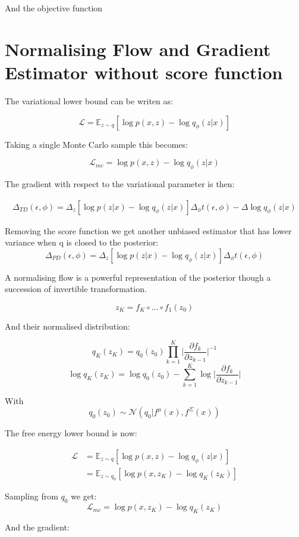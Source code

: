 \documentclass[a4paper]{article}
\begin{document}
And the objective function


\section{Normalising Flow and Gradient Estimator without score function}

The variational lower bound can be writen as:

$$ \mathcal{L} = \mathbb{E}_{z \sim q}[\log p(x, z) - \log q_\phi(z|x)] $$

Taking a single Monte Carlo sample this becomes:

$$ \mathcal{L}_{mc} = \log p(x, z) - \log q_\phi(z|x) $$

The gradient with respect to the variational parameter is then:

\begin{align}
\Delta_{TD}(\epsilon, \phi) = \Delta_z[\log p(z|x) -  \log q_\phi(z|x)] \Delta_\phi t(\epsilon, \phi) - \Delta \log q_\phi(z|x)
\end{align}

Removing the score function we get another unbiased estimator that has lower variance when q is closed to the posterior:
$$ \Delta_{PD}(\epsilon, \phi) =  \Delta_z[\log p(z|x) -  \log q_\phi(z|x)] \Delta_\phi t(\epsilon, \phi)$$

A normalising flow is a powerful representation of the posterior though a succession of invertible transformation.

$$ z_K = f_K \circ ... \circ f_1(z_0)$$

And their normalised distribution:

$$ q_K(z_K) = q_0(z_0) \prod_{k=1}^K \lvert \frac{\partial f_k}{\partial z_{k-1}} \rvert^{-1}$$
$$\log  q_K(z_K) = \log q_0(z_0) -  \sum_{k=1}^K \log \lvert \frac{\partial f_k}{\partial z_{k-1}} \rvert$$

With
$$ q_0(z_0) \sim \mathcal{N}(q_0 | f^\mu(x), f^\Sigma(x))$$

The free energy lower bound is now:

\begin{align}
\mathcal{L} &= \mathbb{E}_{z \sim q}[\log p(x, z) - \log q_\phi(z|x)] \\
&=  \mathbb{E}_{z \sim q_0}[\log p(x, z_K) - \log q_K(z_K)] 
\end{align}

Sampling from $q_0$ we get:
$$ \mathcal{L}_{mc} = \log p(x, z_K) - \log q_K(z_K) $$

And the gradient:
\end{document}
